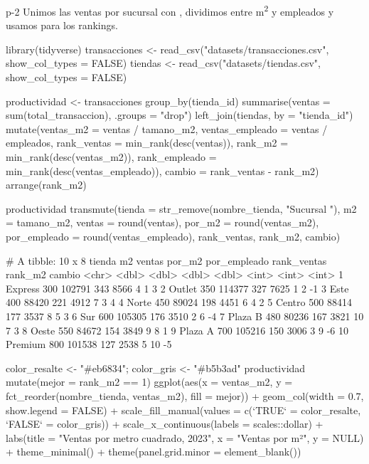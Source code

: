 \begin{solucion}{p-2}
Unimos las ventas por sucursal con , dividimos entre
m\textsuperscript{2} y empleados y usamos  para
los rankings.
\end{solucion}

\begin{rcode}
library(tidyverse)
transacciones <- read_csv("datasets/transacciones.csv",
                          show_col_types = FALSE)
tiendas <- read_csv("datasets/tiendas.csv", show_col_types = FALSE)

productividad <- transacciones %
  group_by(tienda_id) %
  summarise(ventas = sum(total_transaccion), .groups = "drop") %
  left_join(tiendas, by = "tienda_id") %
  mutate(ventas_m2       = ventas / tamano_m2,
         ventas_empleado = ventas / empleados,
         rank_ventas     = min_rank(desc(ventas)),
         rank_m2         = min_rank(desc(ventas_m2)),
         rank_empleado   = min_rank(desc(ventas_empleado)),
         cambio          = rank_ventas - rank_m2) %
  arrange(rank_m2)

productividad %
  transmute(tienda = str_remove(nombre_tienda, "Sucursal "),
            m2 = tamano_m2, ventas = round(ventas),
            por_m2 = round(ventas_m2), por_empleado = round(ventas_empleado),
            rank_ventas, rank_m2, cambio)
\end{rcode}

\begin{rsalida}
# A tibble: 10 x 8
   tienda     m2 ventas por_m2 por_empleado rank_ventas rank_m2 cambio
   <chr>   <dbl>  <dbl>  <dbl>        <dbl>       <int>   <int>  <int>
 1 Express   300 102791    343         8566           4       1      3
 2 Outlet    350 114377    327         7625           1       2     -1
 3 Este      400  88420    221         4912           7       3      4
 4 Norte     450  89024    198         4451           6       4      2
 5 Centro    500  88414    177         3537           8       5      3
 6 Sur       600 105305    176         3510           2       6     -4
 7 Plaza B   480  80236    167         3821          10       7      3
 8 Oeste     550  84672    154         3849           9       8      1
 9 Plaza A   700 105216    150         3006           3       9     -6
10 Premium   800 101538    127         2538           5      10     -5
\end{rsalida}

\begin{rcode}
color_resalte <- "#eb6834"; color_gris <- "#b5b3ad"
productividad %
  mutate(mejor = rank_m2 == 1) %
  ggplot(aes(x = ventas_m2, y = fct_reorder(nombre_tienda, ventas_m2),
             fill = mejor)) +
  geom_col(width = 0.7, show.legend = FALSE) +
  scale_fill_manual(values = c(`TRUE` = color_resalte,
                               `FALSE` = color_gris)) +
  scale_x_continuous(labels = scales::dollar) +
  labs(title = "Ventas por metro cuadrado, 2023",
       x = "Ventas por m²", y = NULL) +
  theme_minimal() +
  theme(panel.grid.minor = element_blank())
\end{rcode}

